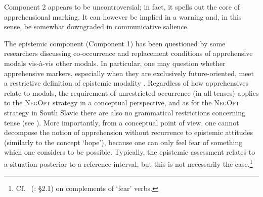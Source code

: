 \documentclass[output=paper,colorlinks,citecolor=brown]{langscibook}
\begin{document}
Component 2 appears to be uncontroversial; in fact, it spells out the core of apprehensional marking. It can however be implied in a warning and, in this sense, be somewhat downgraded in communicative salience. 

\largerpage
The epistemic component (Component 1) has been questioned by some researchers discussing co-occurrence and replacement conditions of apprehensive modals vis-à-vis other modals. In particular, one may question whether apprehensive markers, especially when they are exclusively future-oriented, meet a restrictive definition of epistemic modality \citep{chapters/vuillermet, chapters/introduction}. Regardless of how apprehensives relate to modals, the requirement of unrestricted occurrence (in all tenses) applies to the \textsc{NegOpt} strategy in a conceptual perspective, and as for the \textsc{NegOpt} strategy in South Slavic there are also no grammatical restrictions concerning tense (see ). More importantly, from a conceptual point of view, one cannot decompose the notion of apprehension without recurrence to epistemic attitudes (similarly to the concept `hope'), because one can only feel fear of something which one considers to be possible. Typically, the epistemic assessment relates to a situation posterior to a reference interval, but this is not necessarily the case.\footnote{Cf.\ \citeauthor{dobrushina2021}  (\citeyear{dobrushina2021}: \S2.1) on complements of `fear' verbs.}
\end{document}
